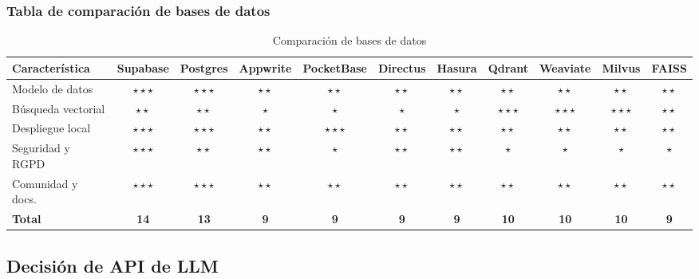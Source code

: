 \subsubsection{Tabla de comparación de bases de datos}

\begin{landscape}
\begin{table}[hbtp]
\centering
\small
\begin{tabular}{|p{4.2cm}|c|c|c|c|c|c|c|c|c|c|}
\hline
\textbf{Característica} & \textbf{Supabase} & \textbf{Postgres} & \textbf{Appwrite} & \textbf{PocketBase} & \textbf{Directus} & \textbf{Hasura} & \textbf{Qdrant} & \textbf{Weaviate} & \textbf{Milvus} & \textbf{FAISS} \\ \hline
Modelo de datos          & $\star\star\star$ & $\star\star\star$ & $\star\star$ & $\star\star$ & $\star\star$ & $\star\star$ & $\star\star$ & $\star\star$ & $\star\star$ & $\star\star$ \\ \hline
Búsqueda vectorial       & $\star\star$ & $\star\star$ & $\star$ & $\star$ & $\star$ & $\star$ & $\star\star\star$ & $\star\star\star$ & $\star\star\star$ & $\star\star$ \\ \hline
Despliegue local         & $\star\star\star$ & $\star\star\star$ & $\star\star$ & $\star\star\star$ & $\star\star$ & $\star\star$ & $\star\star$ & $\star\star$ & $\star\star$ & $\star\star$ \\ \hline
Seguridad y RGPD         & $\star\star\star$ & $\star\star$ & $\star\star$ & $\star$ & $\star\star$ & $\star\star$ & $\star$ & $\star$ & $\star$ & $\star$ \\ \hline
Comunidad y docs.        & $\star\star\star$ & $\star\star\star$ & $\star\star$ & $\star\star$ & $\star\star$ & $\star\star$ & $\star\star$ & $\star\star$ & $\star\star$ & $\star\star$ \\ \hline
\textbf{Total}           & \textbf{14} & \textbf{13} & \textbf{9} & \textbf{9} & \textbf{9} & \textbf{9} & \textbf{10} & \textbf{10} & \textbf{10} & \textbf{9} \\ \hline
\end{tabular}
\caption{Comparación de bases de datos}
\label{tab:databases}
\end{table}
\end{landscape}

\subsection{Decisión de API de LLM}

